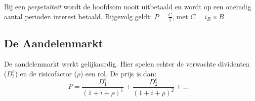 Bij een \textit{perpetu\"iteit} wordt de hoofdsom nooit uitbetaald en wordt op een oneindig aantal perioden interest betaald. Bijgevolg geldt: $P = \frac{C}{i}$, met $C = i_B \times B$


\subsection{De Aandelenmarkt}
\label{sub:De Aandelenmarkt}
De aandelenmarkt werkt gelijkaardig. Hier spelen echter de verwachte dividenten ($D_t^e$) en de risicofactor ($\rho$) een rol. De prijs is dan:
\begin{equation}
  P = \frac{D_1^e}{(1 + i + \rho)^1} +  \frac{D_2^e}{(1 + i + \rho)^2} + \dots
\end{equation}
